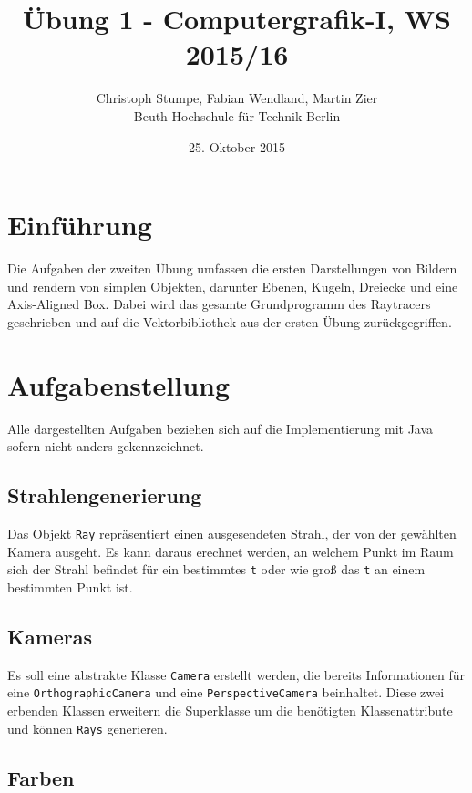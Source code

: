\documentclass[tog]{acmsiggraph}
\title{Übung 1 - Computergrafik-I, WS 2015/16}
\author{Christoph Stumpe, Fabian Wendland, Martin Zier\\Beuth Hochschule für Technik Berlin}
\date{25. Oktober 2015}
\newcommand{\code}[1]{\texttt{#1}}
\begin{document}
\maketitle

\tableofcontents

\section{Einführung}
Die Aufgaben der zweiten Übung umfassen die ersten Darstellungen von Bildern und rendern von simplen Objekten, darunter Ebenen, Kugeln, Dreiecke und eine Axis-Aligned Box. Dabei wird das gesamte Grundprogramm des Raytracers geschrieben und auf die Vektorbibliothek aus der ersten Übung zurückgegriffen.

\section{Aufgabenstellung}

Alle dargestellten Aufgaben beziehen sich auf die Implementierung mit Java sofern nicht anders gekennzeichnet.

\subsection{Strahlengenerierung}

Das Objekt \code{Ray} repräsentiert einen ausgesendeten Strahl, der von der gewählten Kamera ausgeht. Es kann daraus erechnet werden, an welchem Punkt im Raum sich der Strahl befindet für ein bestimmtes \code{t} oder wie groß das \code{t} an einem bestimmten Punkt ist.

\subsection{Kameras}

Es soll eine abstrakte Klasse \code{Camera} erstellt werden, die bereits Informationen für eine \code{OrthographicCamera} und eine \code{PerspectiveCamera} beinhaltet. Diese zwei erbenden Klassen erweitern die Superklasse um die benötigten Klassenattribute und können \code{Rays} generieren.

\subsection{Farben}
\end{document}
